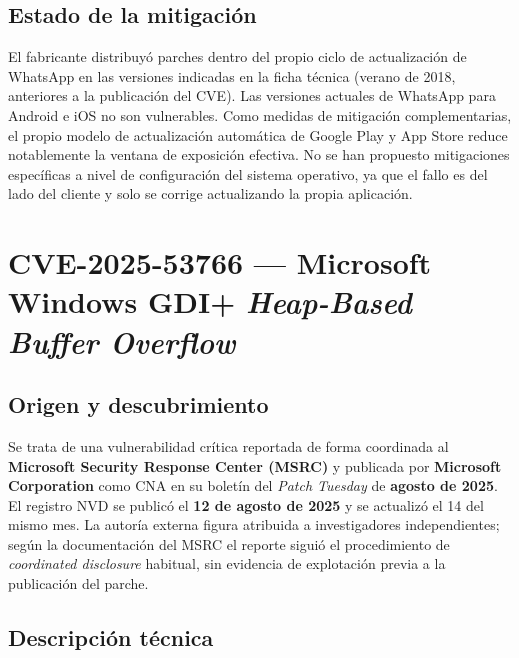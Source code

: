 \subsection*{Estado de la mitigación}

El fabricante distribuyó parches dentro del propio ciclo de actualización de WhatsApp en las versiones indicadas en la ficha técnica (verano de 2018, anteriores a la publicación del CVE). Las versiones actuales de WhatsApp para Android e iOS no son vulnerables. Como medidas de mitigación complementarias, el propio modelo de actualización automática de Google Play y App Store reduce notablemente la ventana de exposición efectiva. No se han propuesto mitigaciones específicas a nivel de configuración del sistema operativo, ya que el fallo es del lado del cliente y solo se corrige actualizando la propia aplicación.

\section{CVE-2025-53766 --- Microsoft Windows GDI+ \textit{Heap-Based Buffer Overflow}}

\subsection*{Origen y descubrimiento}

Se trata de una vulnerabilidad crítica reportada de forma coordinada al \textbf{Microsoft Security Response Center (MSRC)} y publicada por \textbf{Microsoft Corporation} como CNA en su boletín del \textit{Patch Tuesday} de \textbf{agosto de 2025}. El registro NVD se publicó el \textbf{12 de agosto de 2025} y se actualizó el 14 del mismo mes. La autoría externa figura atribuida a investigadores independientes; según la documentación del MSRC el reporte siguió el procedimiento de \textit{coordinated disclosure} habitual, sin evidencia de explotación previa a la publicación del parche.

\subsection*{Descripción técnica}

